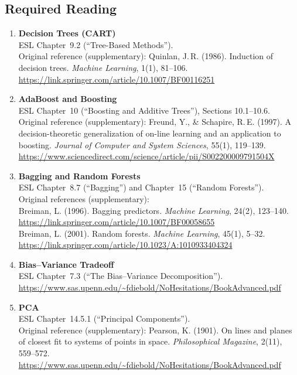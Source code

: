 \documentclass[11pt,a4paper]{article}
\begin{document}
\subsection{Required Reading}
\begin{enumerate}[topsep=2pt,itemsep=6pt,leftmargin=2.2em]
  \item \textbf{Decision Trees (CART)}\\
  ESL Chapter~9.2 (``Tree-Based Methods'').\\
  Original reference (supplementary): Quinlan, J.\,R. (1986). Induction of decision trees.
  \textit{Machine Learning}, 1(1), 81--106.\\
  \url{https://link.springer.com/article/10.1007/BF00116251}

  \item \textbf{AdaBoost and Boosting}\\
  ESL Chapter~10 (``Boosting and Additive Trees''), Sections 10.1--10.6.\\
  Original reference (supplementary): Freund, Y., \& Schapire, R.\,E. (1997). A decision-theoretic generalization of on-line learning
  and an application to boosting. \textit{Journal of Computer and System Sciences}, 55(1), 119--139.\\
  \url{https://www.sciencedirect.com/science/article/pii/S002200009791504X}

  \item \textbf{Bagging and Random Forests}\\
  ESL Chapter~8.7 (``Bagging'') and Chapter~15 (``Random Forests'').\\
  Original references (supplementary):\\
  Breiman, L. (1996). Bagging predictors. \textit{Machine Learning}, 24(2), 123--140.\\
  \url{https://link.springer.com/article/10.1007/BF00058655}\\[2pt]
  Breiman, L. (2001). Random forests. \textit{Machine Learning}, 45(1), 5--32.\\
  \url{https://link.springer.com/article/10.1023/A:1010933404324}

  \item \textbf{Bias--Variance Tradeoff}\\
  ESL Chapter~7.3 (``The Bias--Variance Decomposition'').
  \url{https://www.sas.upenn.edu/~fdiebold/NoHesitations/BookAdvanced.pdf}

  \item \textbf{PCA}\\
  ESL Chapter~14.5.1 (``Principal Components'').\\
  Original reference (supplementary): Pearson, K. (1901). On lines and planes of closest fit to systems of points in space.
  \textit{Philosophical Magazine}, 2(11), 559--572.
  \url{https://www.sas.upenn.edu/~fdiebold/NoHesitations/BookAdvanced.pdf}


\end{enumerate}
\end{document}
